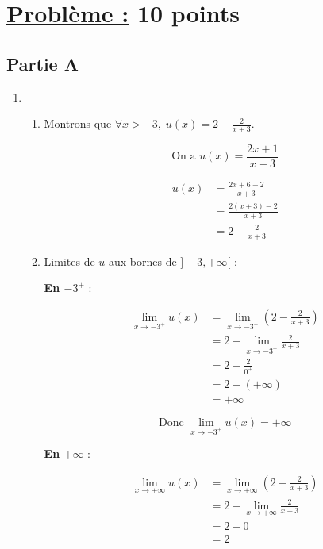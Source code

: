 \documentclass[12pt,a4paper]{article}
\begin{document}
\section*{\underline{Problème :} 10 points}

\subsection*{Partie A}

\begin{enumerate}

\item
\begin{enumerate}
    \item Montrons que \( \forall x > -3, \; u(x) = 2 - \frac{2}{x+3} \).
    
    \[
    \text{On a } u(x) = \frac{2x+1}{x+3}
    \]

    \begin{align*}
        u(x) &= \frac{2x + 6 - 2}{x+3} \\
        &= \frac{2(x+3) - 2}{x+3} \\
        &= 2 - \frac{2}{x+3}
    \end{align*}

    \item Limites de \( u \) aux bornes de \( ]-3, +\infty[ \) :

    \textbf{En \( -3^+ \)} :
    
    \begin{align*}
    \lim_{x \to -3^+} u(x) &= \lim_{x \to -3^+} \left( 2 - \frac{2}{x+3} \right) \\
    &= 2 - \lim_{x \to -3^+} \frac{2}{x+3} \\
    &= 2 - \frac{2}{0^+} \\
    &= 2 - (+\infty) \\
    &= +\infty
    \end{align*}

    \[
    \text{Donc } \lim_{x \to -3^+} u(x) = +\infty
    \]

    \textbf{En \( +\infty \)} :
    
    \begin{align*}
    \lim_{x \to +\infty} u(x) &= \lim_{x \to +\infty} \left( 2 - \frac{2}{x+3} \right) \\
    &= 2 - \lim_{x \to +\infty} \frac{2}{x+3} \\
    &= 2 - 0 \\
    &= 2
    \end{align*}


\end{enumerate}
\end{enumerate}
\end{document}
